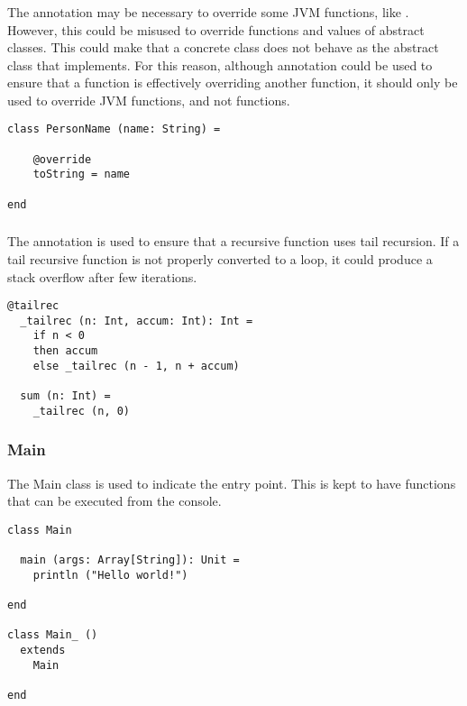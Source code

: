 \subsubsection{\sodaoverride}

The \sodaoverride annotation may be necessary to override some JVM functions, like .
However, this could be misused to override functions and values of abstract classes.
This could make that a concrete class does not behave as the abstract class that implements.
For this reason, although \sodaoverride annotation could be used to ensure that a function is effectively overriding another function, it should only be used to override JVM functions, and not \Soda functions.

\begin{lstlisting}[label={lst:exampleOverride}]
class PersonName (name: String) =

    @override
    toString = name

end
\end{lstlisting}

\subsubsection{\sodatailrec}

The \sodatailrec annotation is used to ensure that a recursive function uses tail recursion.
If a tail recursive function is not properly converted to a loop, it could produce a stack overflow after few iterations.

\begin{lstlisting}[label={lst:exampleTailrecInside}]
  @tailrec
  _tailrec (n: Int, accum: Int): Int =
    if n < 0
    then accum
    else _tailrec (n - 1, n + accum)

  sum (n: Int) =
    _tailrec (n, 0)
\end{lstlisting}

\subsubsection{Main}

The Main class is used to indicate the entry point.
This is kept to have functions that can be executed from the console.

\begin{lstlisting}[label={lst:exampleMain}]
class Main

  main (args: Array[String]): Unit =
    println ("Hello world!")

end

class Main_ ()
  extends
    Main

end
\end{lstlisting}

